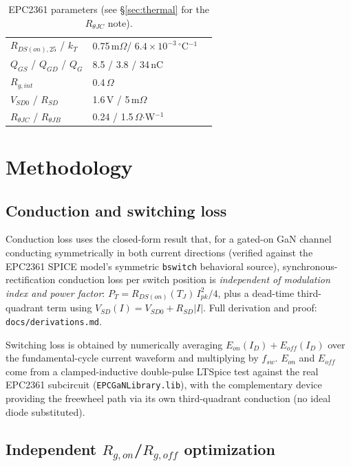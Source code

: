 \documentclass[10pt,twocolumn]{article}
\newcommand{\ohm}{\ensuremath{\Omega}}
\newcommand{\degC}{\ensuremath{^{\circ}\mathrm{C}}}
\begin{document}
\begin{table}[h]
\centering\footnotesize
\caption{EPC2361 parameters (see \S\ref{sec:thermal} for the $R_{\theta JC}$ note).}
\label{tab:device}
\begin{tabular}{@{}lll@{}}
\toprule
$R_{DS(on),25}$ / $k_T$ & 0.75\,m\ohm / $6.4\!\times\!10^{-3}$\,\degC$^{-1}$ \\
$Q_{GS}$ / $Q_{GD}$ / $Q_G$ & 8.5 / 3.8 / 34\,nC \\
$R_{g,int}$ & 0.4\,\ohm \\
$V_{SD0}$ / $R_{SD}$ & 1.6\,V / 5\,m\ohm \\
$R_{\theta JC}$ / $R_{\theta JB}$ & 0.24 / 1.5\,\ohm$\cdot$W$^{-1}$ \\
\bottomrule
\end{tabular}
\end{table}

\section{Methodology}

\subsection{Conduction and switching loss}

Conduction loss uses the closed-form result that, for a gated-on GaN channel conducting
symmetrically in both current directions (verified against the EPC2361 SPICE model's
symmetric \texttt{bswitch} behavioral source), synchronous-rectification conduction loss
per switch position is \emph{independent of modulation index and power factor}:
$P_{T} = R_{DS(on)}(T_J)\,I_{pk}^2/4$, plus a dead-time third-quadrant term using
$V_{SD}(I)=V_{SD0}+R_{SD}|I|$. Full derivation and proof: \texttt{docs/derivations.md}.

Switching loss is obtained by numerically averaging $E_{on}(I_D)+E_{off}(I_D)$ over the
fundamental-cycle current waveform and multiplying by $f_{sw}$. $E_{on}$ and $E_{off}$
come from a clamped-inductive double-pulse LTSpice test against the real EPC2361
subcircuit (\texttt{EPCGaNLibrary.lib}), with the complementary device providing the
freewheel path via its own third-quadrant conduction (no ideal diode substituted).

\subsection{Independent $R_{g,on}$/$R_{g,off}$ optimization}
\end{document}
